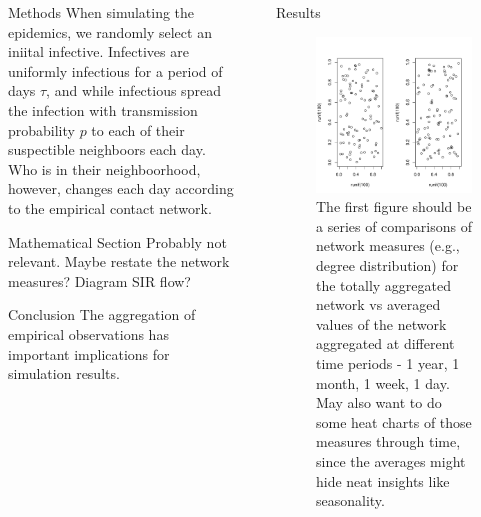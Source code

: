 \documentclass[final]{beamer} %
\newcommand{\spacer}{\begin{column}{0.02\paperwidth}\end{column}}
\begin{document}
\begin{frame}{}
\begin{columns}[t]
\begin{column}[t]{0.33\paperwidth}
\begin{block}{Methods}
When simulating the epidemics, we randomly select an iniital infective.  Infectives are uniformly infectious for a period of days $\tau$, and while infectious spread the infection with transmission probability $p$ to each of their suspectible neighboors each day.  Who is in their neighboorhood, however, changes each day according to the empirical contact network.
    \end{block}
    \begin{block}{Mathematical Section}
Probably not relevant.  Maybe restate the network measures?  Diagram SIR flow?
    \end{block}
    \begin{block}{Conclusion}
The aggregation of empirical observations has important implications for simulation results.
    \end{block}
    \end{column}
    \spacer{}
    \begin{column}{0.6\paperwidth}
    \begin{block}{Results}
    \begin{figure}
\includegraphics{poster-plotfig1}
    \caption{The first figure should be a series of comparisons of network measures (e.g., degree distribution) for the totally aggregated network vs averaged values of the network aggregated at different time periods - 1 year, 1 month, 1 week, 1 day.  May also want to do some heat charts of those measures through time, since the averages might hide neat insights like seasonality.}

\end{figure}
\end{block}
\end{column}
\end{columns}
\end{frame}
\end{document}
